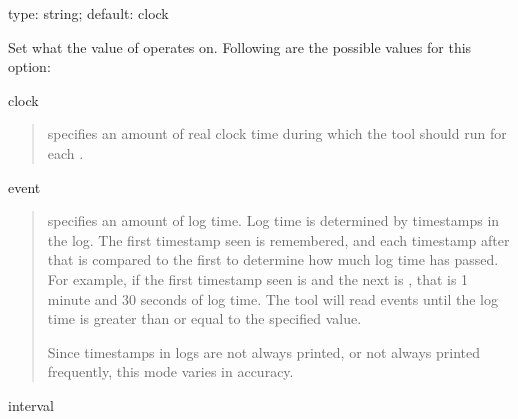 \documentclass[letterpaper,10pt,english]{sphinxmanual}
\begin{document}
\begin{fulllineitems}
\label{\detokenize{mariadb-query-digest:cmdoption-mariadb-query-digest-run-time-mode}}
type: string; default: clock

Set what the value of {\hyperref[\detokenize{mariadb-query-digest:cmdoption-mariadb-query-digest-run-time}]{}} operates on.  Following are the possible
values for this option:

clock
\begin{quote}

{\hyperref[\detokenize{mariadb-query-digest:cmdoption-mariadb-query-digest-run-time}]{}} specifies an amount of real clock time during which the tool
should run for each {\hyperref[\detokenize{mariadb-query-digest:cmdoption-mariadb-query-digest-iterations}]{}}.
\end{quote}

event
\begin{quote}

{\hyperref[\detokenize{mariadb-query-digest:cmdoption-mariadb-query-digest-run-time}]{}} specifies an amount of log time.  Log time is determined by
timestamps in the log.  The first timestamp seen is remembered, and each
timestamp after that is compared to the first to determine how much log time
has passed.  For example, if the first timestamp seen is  and the
next is , that is 1 minute and 30 seconds of log time.  The tool
will read events until the log time is greater than or equal to the specified
{\hyperref[\detokenize{mariadb-query-digest:cmdoption-mariadb-query-digest-run-time}]{}} value.

Since timestamps in logs are not always printed, or not always printed
frequently, this mode varies in accuracy.
\end{quote}

interval
\begin{quote}


\end{quote}
\end{fulllineitems}
\end{document}
